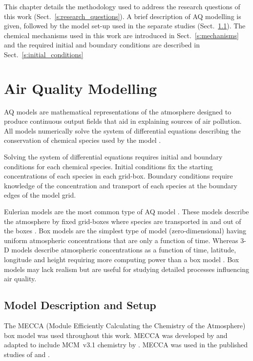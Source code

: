 This chapter details the methodology used to address the research questions of this work (Sect.~\ref{s:research_questions}).
A brief description of AQ modelling is given, followed by the model set-up used in the separate studies (Sect.~\ref{ss:model_setup}). 
The chemical mechanisms used in this work are introduced in Sect.~\ref{s:mechanisms} and the required initial and boundary conditions are described in Sect.~\ref{s:initial_conditions} 

\section{Air Quality Modelling} \label{s:modelling}
AQ models are mathematical representations of the atmosphere designed to produce continuous output fields that aid in explaining sources of air pollution.
All models numerically solve the system of differential equations describing the conservation of chemical species used by the model \citep{Russell:2000}.

Solving the system of differential equations requires initial and boundary conditions for each chemical species.
Initial conditions fix the starting concentrations of each species in each grid-box.
Boundary conditions require knowledge of the concentration and transport of each species at the boundary edges of the model grid.

Eulerian models are the most common type of AQ model \citep{Russell:2000}.
These models describe the atmosphere by fixed grid-boxes where species are transported in and out of the boxes \citep{Seinfeld:2006}. 
Box models are the simplest type of model (zero-dimensional) having uniform atmospheric concentrations that are only a function of time.
Whereas 3-D models describe atmospheric concentrations as a function of time, latitude, longitude and height requiring more computing power than a box model \citep{Seinfeld:2006}.
Box models may lack realism but are useful for studying detailed processes influencing air quality.

\subsection{Model Description and Setup} \label{ss:model_setup}
The MECCA (Module Efficiently Calculating the Chemistry of the Atmosphere) box model was used throughout this work.
MECCA was developed by \citet{Sander:2005} and adapted to include MCM~v3.1 chemistry by \citet{Butler:2011}.
MECCA was used in the published studies of \citet{Kubistin:2010} and \citet{Lourens:2016}.

